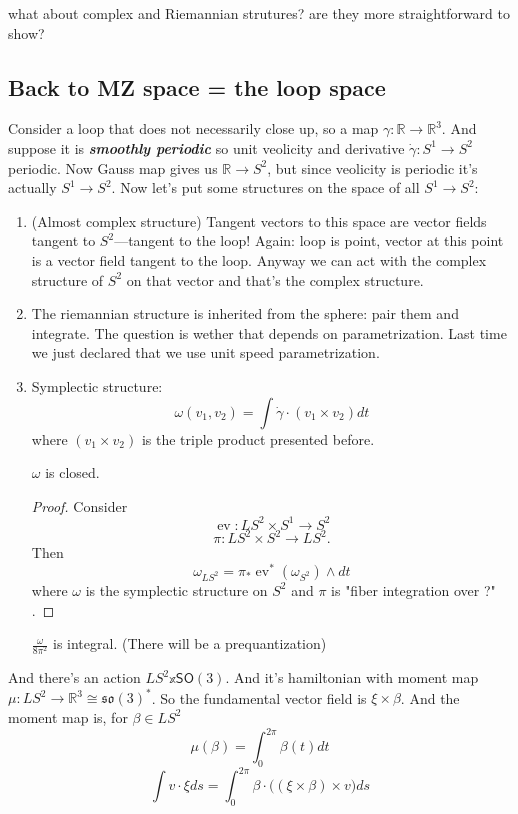 \begin{question}\leavevmode
	what about complex and Riemannian strutures? are they more straightforward to show?
\end{question}

\subsection{Back to MZ space = the loop space}
Consider a loop that does not necessarily close up, so a map $\gamma:\mathbb{R} \to \mathbb{R}^3$. And suppose it is \textit{\textbf{smoothly periodic}} so unit veolicity and derivative $\dot\gamma:S^1\to S^2$ periodic. Now Gauss map gives us $\mathbb{R}\to S^2$, but since veolicity is periodic it's actually $S^1 \to S^2$. Now let's put some structures on the space of all $S^1 \to S^2$:
\begin{enumerate}
\item (Almost complex structure) Tangent vectors to this space are vector fields tangent to $S^2$---tangent to the loop! Again: loop is point, vector at this point is a vector field tangent to the loop. Anyway we can act with the complex structure of $S^2$ on that vector and that's the complex structure.
\item The riemannian structure is inherited from the sphere: pair them and integrate. The question is wether that depends on parametrization. Last time we just declared that we use unit speed parametrization.
\item Symplectic structure:
	\[\omega(v_1,v_2)=\int \dot\gamma\cdot(v_1\times v_2) dt\]
	where $(v_1\times v_2)$ is the triple product presented before.
	\begin{prop}\leavevmode
		$\omega$ is closed.
	\end{prop}
	\begin{proof}\leavevmode
	Consider
	\[\operatorname{ev}:LS^2\times S^1\to S^2\]
	\[\pi:LS^2\times S^2\to LS^2.\]
	Then
\[\omega_{LS^2}=\pi_*\operatorname{ev}^*(\omega_{S^2})\wedge dt\]
	where $\omega$ is the symplectic structure on $S^2$ and $\pi$ is "fiber integration over ?" .
	\end{proof}
	\begin{coro}\leavevmode
		$\frac{\omega}{8\pi^2}$ is integral. (There will be a prequantization)
	\end{coro}
\end{enumerate}

And there's an action $LS^2 \mathbb{x}\mathsf{SO}(3)$. And it's hamiltonian with moment map $\mu:LS^2 \to \mathbb{R}^3\cong \mathfrak{so}(3)^*$. So the fundamental vector field is $\xi \times \beta$. And the moment map is, for $\beta \in LS^2$
\[\mu(\beta)=\int_{0}^{2\pi}\beta(t)dt\]
\[\int v\cdot\xi ds = \int_{0}^{2\pi}\beta\cdot \Big((\xi \times \beta)\times v\Big)ds\]






